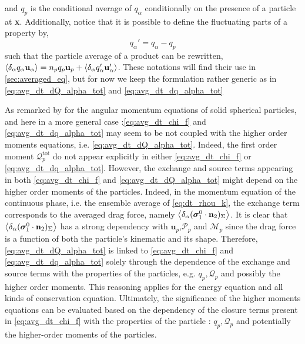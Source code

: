 and $q_p$ is the conditional average of $q_\alpha$ conditionally on the presence of a particle at \textbf{x}. 
Additionally, notice that it is possible to define the fluctuating parts of a property by, 
\begin{equation}
    q_\alpha' = q_\alpha - q_p
\end{equation}
such that the particle average of a product can be rewritten, $\left<\delta_\alpha q_\alpha\textbf{u}_\alpha\right> = n_p q_p \textbf{u}_p + \left<\delta_\alpha q_\alpha' \textbf{u}_\alpha'\right>$. 
These notations will find their use in \ref{sec:averaged_eq}, but for now we keep the formulation rather generic as in \ref{eq:avg_dt_dQ_alpha_tot} and \ref{eq:avg_dt_dq_alpha_tot}

As remarked by \citet{jackson1997locally} for the angular momentum equations of solid spherical particles, and here in a more general case :\ref{eq:avg_dt_chi_f} and \ref{eq:avg_dt_dq_alpha_tot} may seem to be not coupled with the higher order moments equations, i.e. \ref{eq:avg_dt_dQ_alpha_tot}. 
Indeed, the first order moment $\mathcal{Q}_p^\text{tot}$ do not appear explicitly in either \ref{eq:avg_dt_chi_f} or \ref{eq:avg_dt_dq_alpha_tot}.
However, the exchange and source terms 
appearing in both \ref{eq:avg_dt_chi_f} and \ref{eq:avg_dt_dQ_alpha_tot} might depend on the higher order moments of the particles.
Indeed, in the momentum equation of the continuous phase, i.e. the ensemble average of \ref{eq:dt_rhou_k}, the exchange term corresponds to the averaged drag force, namely $\left<\delta_\alpha ( \bm{\sigma}_1^0\cdot \textbf{n}_2 )_{\Sigma}\right>$. 
It is clear that $\left<\delta_\alpha ( \bm{\sigma}_1^0\cdot \textbf{n}_2 )_{\Sigma}\right>$ has a strong dependency with $\textbf{u}_p$,$\mathcal{P}_p$ and $\mathcal{M}_p$ since the drag force is a function of both the particle's kinematic and its shape. 
Therefore, \ref{eq:avg_dt_dQ_alpha_tot} is linked to \ref{eq:avg_dt_chi_f} and \ref{eq:avg_dt_dq_alpha_tot} solely through the dependence of the exchange and source terms with the properties of the particles, e.g. $q_p,\mathcal{Q}_p$ and possibly the higher order moments. 
This reasoning applies for the energy equation and all kinds of conservation equation. 
Ultimately, the significance of the higher moments equations can be evaluated based on the dependency of the closure terms present in \ref{eq:avg_dt_chi_f} with the properties of the particle : $q_p, \mathcal{Q}_p$ and potentially the higher-order moments of the particles. 

